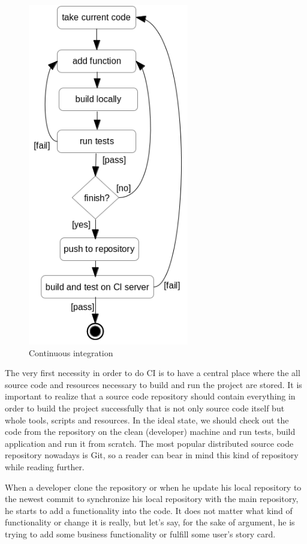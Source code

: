 \documentclass[12pt,final,oneside]{fithesis}
\begin{document}
\begin{figure}
	\centering
	\includegraphics[width=70mm]{img/ci.png}
	\caption{Continuous integration}
	\label{fig:ci_process}
\end{figure}

The very first necessity in order to do CI is to have a central place where the all source code and resources necessary to build and run the project are stored. It is important to realize that a source code repository should contain everything in order to build the project successfully that is not only source code itself but whole tools, scripts and resources. In the ideal state, we should check out the code from the repository on the clean (developer) machine and run tests, build application and run it from scratch. The most popular distributed source code repository nowadays is Git, so a reader can bear in mind this kind of repository while reading further.

When a developer clone the repository or when he update his local repository to the newest commit to synchronize his local repository with the main repository, he starts to add a functionality into the code. It does not matter what kind of functionality or change it is really, but let's say, for the sake of argument, he is trying to add some business functionality or fulfill some user's story card.
\end{document}
